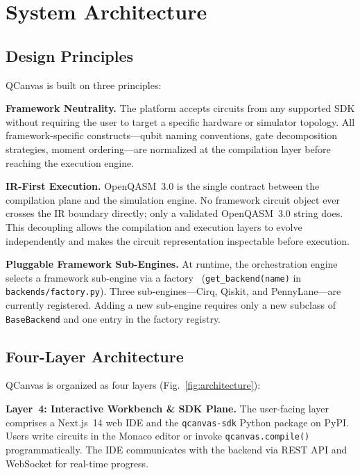 \documentclass[runningheads]{llncs}
\begin{document}

\section{System Architecture}

\subsection{Design Principles}

QCanvas is built on three principles:

\textbf{Framework Neutrality.} The platform accepts circuits from any supported SDK without requiring the user to target a specific hardware or simulator topology. All framework-specific constructs---qubit naming conventions, gate decomposition strategies, moment ordering---are normalized at the compilation layer before reaching the execution engine.

\textbf{IR-First Execution.} OpenQASM~3.0 is the single contract between the compilation plane and the simulation engine. No framework circuit object ever crosses the IR boundary directly; only a validated OpenQASM~3.0 string does. This decoupling allows the compilation and execution layers to evolve independently and makes the circuit representation inspectable before execution.

\textbf{Pluggable Framework Sub-Engines.} At runtime, the orchestration engine selects a framework sub-engine via a factory~\cite{gamma1994} (\texttt{get\_backend(name)} in \texttt{backends/factory.py}). Three sub-engines---Cirq, Qiskit, and PennyLane---are currently registered. Adding a new sub-engine requires only a new subclass of \texttt{BaseBackend} and one entry in the factory registry.

\subsection{Four-Layer Architecture}

QCanvas is organized as four layers (Fig.~\ref{fig:architecture}):

\textbf{Layer~4: Interactive Workbench \& SDK Plane.} The user-facing layer comprises a Next.js~14 web IDE and the \texttt{qcanvas-sdk} Python package on PyPI. Users write circuits in the Monaco editor or invoke \texttt{qcanvas.compile()} programmatically. The IDE communicates with the backend via REST API and WebSocket for real-time progress.
\end{document}
